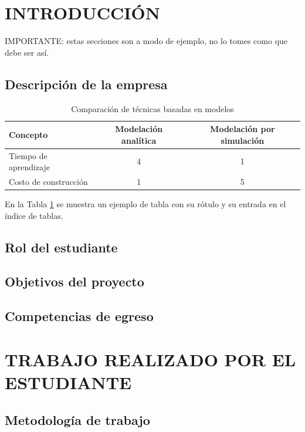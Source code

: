 
\section{INTRODUCCIÓN}

IMPORTANTE: estas secciones son a modo de ejemplo, no lo tomes como que debe ser así.

\subsection{Descripción de la empresa}

\begin{table}[H]
    \centering
    \caption{Comparación de técnicas basadas en modelos}
    \label{tab:ejemplo}
    \begin{tabular}{lcc}
        \hline
        Concepto              & Modelación analítica & Modelación por simulación \\
        \hline
        Tiempo de aprendizaje & 4                    & 1                         \\
        Costo de construcción & 1                    & 5                         \\
        \hline
    \end{tabular}
\end{table}

En la Tabla \ref{tab:ejemplo} se muestra un ejemplo de tabla con su rótulo y su entrada en el índice de tablas.

\subsection{Rol del estudiante}

\subsection{Objetivos del proyecto}



\subsection{Competencias de egreso}

\newpage
\section{TRABAJO REALIZADO POR EL ESTUDIANTE}
\subsection{Metodología de trabajo} 
